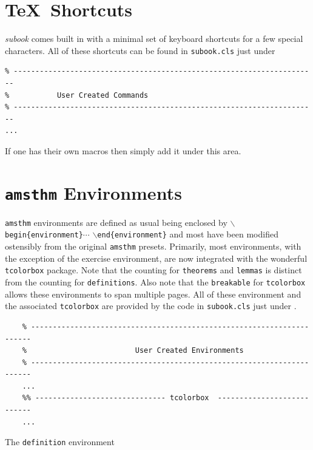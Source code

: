 \section{\TeX\ Shortcuts}\label{sec:shortcuts}
\textit{subook} comes built in with a minimal set of keyboard shortcuts for a few special characters. All of these shortcuts can be found in \texttt{subook.cls} just under
\begin{verbatim}
% ----------------------------------------------------------------------
%           User Created Commands
% ----------------------------------------------------------------------
...
\end{verbatim}
If one has their own macros then simply add it under this area. 


\section{\texttt{amsthm} Environments}\label{Sub:Special}
\texttt{amsthm} environments are defined as usual being enclosed by \texttt{$\backslash$begin\{environment\}}$\cdots$ \texttt{$\backslash$end\{environment\}} 
and most have been modified ostensibly from the original \texttt{amsthm} presets. 
Primarily, most environments, 
with the exception of the exercise environment, are now integrated with the wonderful \texttt{tcolorbox} package. 
Note that the counting for \texttt{theorems} and \texttt{lemmas} is distinct from the counting for \texttt{definitions}. 
Also note that the \texttt{breakable} for \texttt{tcolorbox} allows these environments to span multiple pages.
All of these environment and the associated \texttt{tcolorbox} are provided by the  code in \texttt{subook.cls} just under \lecture.
\begin{verbatim}
    % ----------------------------------------------------------------------
    %                         User Created Environments 
    % ----------------------------------------------------------------------
    ...
    %% ------------------------------ tcolorbox  ---------------------------
    ...
\end{verbatim}

\begin{definition}[Test]
    The \texttt{definition} environment
\end{definition}


